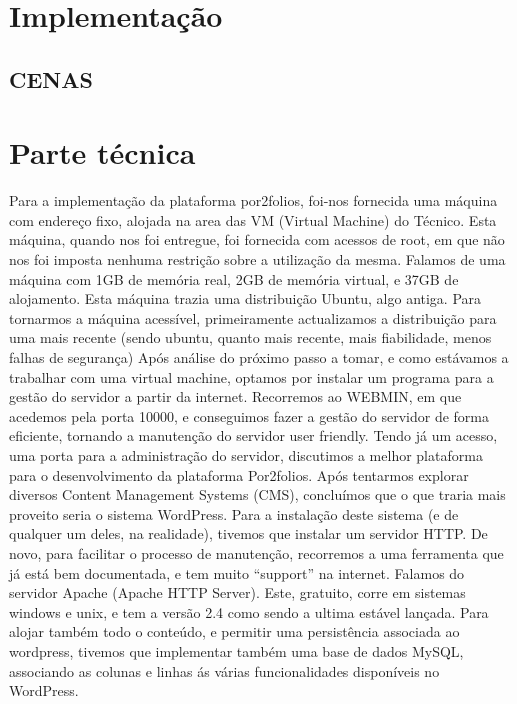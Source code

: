 \documentclass[a4paper,12pt,journal,twoside,compsoc]{PPIEEEtran}
\begin{document}
\section{Implementação }
\subsection{ CENAS } 


\section{Parte técnica}
Para a implementação da plataforma por2folios, foi-nos fornecida uma máquina com endereço fixo, alojada na area das 
VM (Virtual Machine) do Técnico. Esta máquina, quando nos foi entregue, foi fornecida com acessos de root, em que não nos foi 
imposta nenhuma restrição sobre a utilização da mesma.
Falamos de uma máquina com 1GB de memória real, 2GB de memória virtual, e 37GB de alojamento.
Esta máquina trazia uma distribuição Ubuntu, algo antiga.
Para tornarmos a máquina acessível, primeiramente actualizamos a distribuição para uma mais recente (sendo ubuntu, quanto mais recente, mais fiabilidade, menos falhas de segurança)
Após análise do próximo passo a tomar, e como estávamos a trabalhar com uma virtual machine, optamos por instalar um programa para a gestão do servidor a partir da internet. Recorremos ao WEBMIN, em que acedemos pela porta 10000, e conseguimos fazer a gestão do servidor de forma eficiente, tornando a manutenção do servidor user friendly.
Tendo já um acesso, uma porta para a administração do servidor, discutimos a melhor plataforma para o desenvolvimento da plataforma Por2folios. Após tentarmos explorar diversos Content Management Systems (CMS), concluímos que o que traria mais proveito seria o sistema WordPress. Para a instalação deste sistema (e de qualquer um deles, na realidade), tivemos que instalar um servidor HTTP. De novo, para facilitar o processo de manutenção, recorremos a uma ferramenta que já está bem documentada, e tem muito “support” na internet. Falamos do servidor Apache (Apache HTTP Server). Este, gratuito, corre em sistemas windows e unix, e tem a versão 2.4 como sendo a ultima estável lançada.
Para alojar também todo o conteúdo, e permitir uma persistência associada ao wordpress, tivemos que implementar também uma base de dados MySQL, associando as colunas e linhas ás várias funcionalidades disponíveis no WordPress.
\end{document}
